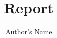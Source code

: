 \documentclass{article}
\begin{document}
\title{Report}
\author{Author's Name}
\maketitle
\end{document}
